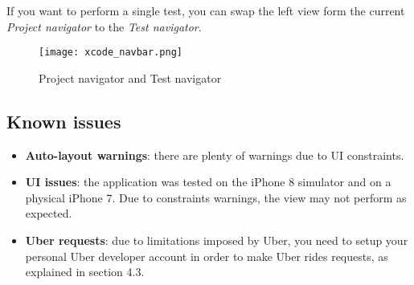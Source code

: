 If you want to perform a single test, you can swap the left view form the current \textit{Project navigator} to the \textit{Test navigator}.

\begin{figure}[H]
	\centering
	\texttt{[image: xcode\_navbar.png]}
	\caption{Project navigator and Test navigator}
\end{figure}


\subsection{Known issues}

\begin{itemize}
	\item \textbf{Auto-layout warnings}: there are plenty of warnings due to UI constraints.
	\item \textbf{UI issues}: the application was tested on the iPhone 8 simulator and on a physical iPhone 7. Due to constraints warnings, the view may not perform as expected.
	\item \textbf{Uber requests}: due to limitations imposed by Uber, you need to setup your personal Uber developer account in order to make Uber rides requests, as explained in section 4.3.
\end{itemize}